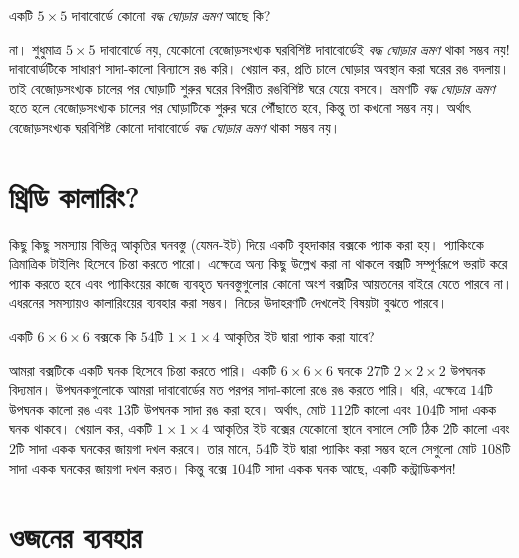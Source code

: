\documentclass[11pt]{report}
\begin{document}
\begin{tcolorbox}[colframe=black!80!green,title=উদাহরণ 2.2.1]
একটি $5 \times 5$ দাবাবোর্ডে কোনো \textit{বদ্ধ ঘোড়ার ভ্রমণ} আছে কি?
\end{tcolorbox}

না। শুধুমাত্র $5 \times 5$ দাবাবোর্ডে নয়, যেকোনো বেজোড়সংখ্যক ঘরবিশিষ্ট দাবাবোর্ডেই \textit{বদ্ধ ঘোড়ার ভ্রমণ} থাকা সম্ভব নয়! দাবাবোর্ডটিকে সাধারণ সাদা-কালো বিন্যাসে রঙ করি। খেয়াল কর, প্রতি চালে ঘোড়ার অবস্থান করা ঘরের রঙ বদলায়। তাই বেজোড়সংখ্যক চালের পর ঘোড়াটি শুরুর ঘরের বিপরীত রঙবিশিষ্ট ঘরে যেয়ে বসবে। ভ্রমণটি \textit{বদ্ধ ঘোড়ার ভ্রমণ} হতে হলে বেজোড়সংখ্যক চালের পর ঘোড়াটিকে শুরুর ঘরে পৌঁছাতে হবে, কিন্তু তা কখনো সম্ভব নয়। অর্থাৎ বেজোড়সংখ্যক ঘরবিশিষ্ট কোনো দাবাবোর্ডে \textit{বদ্ধ ঘোড়ার ভ্রমণ} থাকা সম্ভব নয়।\\

\section{থ্রিডি কালারিং?}

কিছু কিছু সমস্যায় বিভিন্ন আকৃতির ঘনবস্তু (যেমন-ইট) দিয়ে একটি বৃহদাকার বক্সকে প্যাক করা হয়। প্যাকিংকে ত্রিমাত্রিক টাইলিং হিসেবে চিন্তা করতে পারো। এক্ষেত্রে অন্য কিছু উল্লেখ করা না থাকলে বক্সটি সম্পূর্ণরূপে ভরাট করে প্যাক করতে হবে এবং প্যাকিংয়ের কাজে ব্যবহৃত ঘনবস্তুগুলোর কোনো অংশ বক্সটির আয়তনের বাইরে যেতে পারবে না। এধরনের সমস্যায়ও কালারিংয়ের ব্যবহার করা সম্ভব। নিচের উদাহরণটি দেখলেই বিষয়টা বুঝতে পারবে।\\

\begin{tcolorbox}[colframe=black!80!green,title=উদাহরণ 2.3.1]
একটি $6 \times 6 \times 6$ বক্সকে কি $54$টি $1 \times 1 \times 4$ আকৃতির ইট দ্বারা প্যাক করা যাবে?
\end{tcolorbox}

আমরা বক্সটিকে একটি ঘনক হিসেবে চিন্তা করতে পারি। একটি $6 \times 6 \times 6$ ঘনকে $27$টি $2 \times 2 \times 2$ উপঘনক বিদ্যমান। উপঘনকগুলোকে আমরা দাবাবোর্ডের মত পরপর সাদা-কালো রঙে রঙ করতে পারি। ধরি, এক্ষেত্রে $14$টি উপঘনক কালো রঙ এবং $13$টি উপঘনক সাদা রঙ করা হবে। অর্থাৎ, মোট $112$টি কালো এবং $104$টি সাদা একক ঘনক থাকবে। খেয়াল কর, একটি $1 \times 1 \times 4$ আকৃতির ইট বক্সের যেকোনো স্থানে বসালে সেটি ঠিক $2$টি কালো এবং $2$টি সাদা একক ঘনকের জায়গা দখল করবে। তার মানে, $54$টি ইট দ্বারা প্যাকিং করা সম্ভব হলে সেগুলো মোট $108$টি সাদা একক ঘনকের জায়গা দখল করত। কিন্তু বক্সে $104$টি সাদা একক ঘনক আছে, একটি কন্ট্রাডিকশন!\\

\section{ওজনের ব্যবহার}
\end{document}
